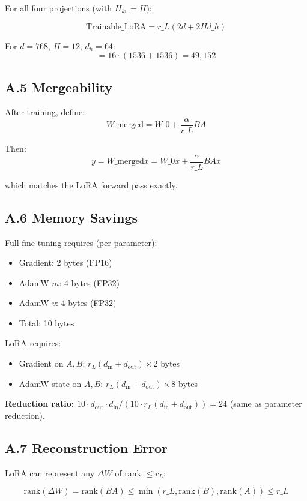For all four projections (with $H_{kv} = H$):

\[
\text{Trainable}\_\text{LoRA} = r\_L (2d + 2 H d\_h)
\tag{A.5}
\]

For $d = 768$, $H = 12$, $d_h = 64$:
\[
= 16 \cdot (1536 + 1536) = 49,152
\tag{A.6}
\]

\subsection{A.5 Mergeability}

After training, define:
\[
W\_\text{merged} = W\_0 + \frac{\alpha}{r\_L} B A
\tag{A.7}
\]

Then:
\[
y = W\_\text{merged} x = W\_0 x + \frac{\alpha}{r\_L} B A x
\tag{A.8}
\]

which matches the LoRA forward pass exactly.

\subsection{A.6 Memory Savings}

Full fine-tuning requires (per parameter):
\begin{itemize}
\item Gradient: 2 bytes (FP16)
\item AdamW $m$: 4 bytes (FP32)
\item AdamW $v$: 4 bytes (FP32)
\item Total: 10 bytes

\end{itemize}
LoRA requires:
\begin{itemize}
\item Gradient on $A, B$: $r_L(d_\text{in} + d_\text{out}) \times 2$ bytes
\item AdamW state on $A, B$: $r_L(d_\text{in} + d_\text{out}) \times 8$ bytes

\end{itemize}
\textbf{Reduction ratio:} $10 \cdot d_\text{out} \cdot d_\text{in} / (10 \cdot r_L (d_\text{in} + d_\text{out})) = 24$ (same as parameter reduction).

\subsection{A.7 Reconstruction Error}

LoRA can represent any $\Delta W$ of rank $\leq r_L$:

\[
\text{rank}(\Delta W) = \text{rank}(BA) \leq \min(r\_L, \text{rank}(B), \text{rank}(A)) \leq r\_L
\tag{A.9}
\]

